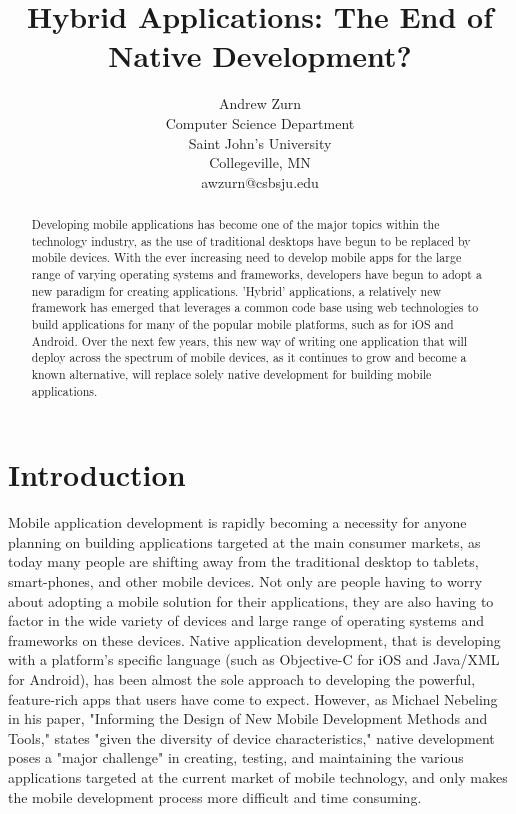 \documentclass[11pt, twocolumn]{article}
\title{Hybrid Applications: The End of Native Development?}
\author[1]{Andrew Zurn\\Computer Science Department\\Saint John's University\\Collegeville, MN\\awzurn@csbsju.edu}
\begin{document}
\maketitle
\begin{abstract}
Developing mobile applications has become one of the major topics within the technology industry, as the use of traditional desktops have begun to be replaced by mobile devices.  With the ever increasing need to develop mobile apps for the large range of varying operating systems and frameworks, developers have begun to adopt a new paradigm for creating applications.  'Hybrid' applications, a relatively new framework has emerged that leverages a common code base using web technologies to build applications for many of the popular mobile platforms, such as for iOS and Android.  Over the next few years, this new way of writing one application that will deploy across the spectrum of mobile devices, as it continues to grow and become a known alternative, will replace solely native development for building mobile applications.
\end{abstract}

\section{Introduction}
Mobile application development is rapidly becoming a necessity for anyone planning on building applications targeted at the main consumer markets, as today many people are shifting away from the traditional desktop to tablets, smart-phones, and other mobile devices.  Not only are people having to worry about adopting a mobile solution for their applications, they are also having to factor in the wide variety of devices and large range of operating systems and frameworks on these devices.  Native application development, that is developing with a platform's specific language (such as Objective-C for iOS and Java/XML for Android), has been almost the sole approach to developing the powerful, feature-rich apps that users have come to expect.  However, as Michael Nebeling in his paper, "Informing the Design of New Mobile Development Methods and Tools," states "given the diversity of device characteristics," native development poses a "major challenge" in creating, testing, and maintaining the various applications targeted at the current market of mobile technology, and only makes the mobile development process more difficult and time consuming. ~\cite{Nebeling2013}\\
\end{document}
